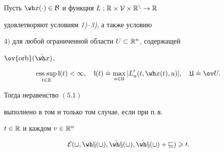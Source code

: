 \begin{lems}


Пусть $\wh x(\cdot)\in\cal B$ и функция $L:\Bbb


R\times\cal V\times\Bbb R^n\to\Bbb R$


удовлетворяют условиям {\em 1)--3)}, а также условию





$4)$ для любой ограниченной области $U\subset\Bbb R^n$, содержащей


$\ov{\orb}(\Dot{\wh x})$,


\begin{equation}


\esssup_{t\in\Bbb R}\frak l(t)<\infty,\quad


\frak l(t)\doteq \max_{u\in\frak U}|L'_u(t,\wh


x(t),u)|,\quad \frak U\doteq \ov U.


\end{equation}





Тогда неравенство $(5.1)$


выполнено в том и только том случае, если при п.\,в.


$t\in\Bbb R$ и каждом $v\in\Bbb R^n$


\begin{equation}


\cal E(t,\wh x(t),\Dot{\wh x}(t),\Dot{\wh x}(t)+v)\geqslant 0.


\end{equation}


\end{lems}








